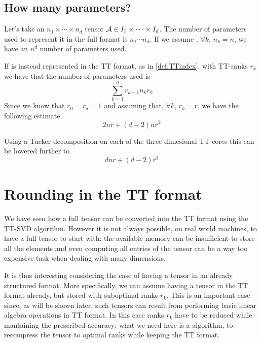 
\subsection{How many parameters?}
Let's take an $n_1 \times \cdots \times n_d$ tensor $\mathcal{A} \in I_1 \times \cdots \times I_d$. The number of parameters used to represent it in the full format is $n_1 \cdots n_d$. If we assume , $\forall k$, $n_k  = n$, we have an $n^d$ number of parameters used.

If \A is instead represented in the TT format, as in \ref{def:TTindex}, with TT-ranks $r_k$ we have that the number of parameters used is
\begin{equation*}
  \sum_{k=1}^d r_{k-1} n_k r_k
\end{equation*}
Since we know that $r_0 = r_d = 1$ and assuming that, $\forall k$, $r_k = r$, we have the following estimate
\begin{equation*}
  2nr + (d-2)nr^2
\end{equation*}

Using a Tucker decomposition on each of the three-dimesional TT-cores this can be lowered further to
\begin{equation*}
  dnr + (d-2)r^3
\end{equation*}

\section{Rounding in the TT format}
We have seen how a full tensor can be converted into the TT format using the TT-SVD algorithm. However it is not always possible, on real world machines, to have a full tensor to start with: the available memory can be insufficient to store all the elements and even computing all entries of the tensor can be a way too expensive task when dealing with many dimensions.

It is thus interesting considering the case of having a tensor in an already structured format. More specifically, we can assume having a tensor in the TT format already, but stored with suboptimal ranks $r_k$. This is an important case since, as will be shown later, such tensors can result from performing basic linear algebra operations in TT format. In this case ranks $r_k$ have to be reduced while mantaining the prescribed accuracy: what we need here is a  algorithm, to recompress the tensor to optimal ranks while keeping the TT format.

